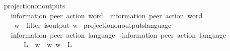 \begin{isabellebody}
\isamarkupfalse%
\ projection{\isacharunderscore}{\kern0pt}on{\isacharunderscore}{\kern0pt}outputs\isanewline
\ \ {\isacharcolon}{\kern0pt}{\isacharcolon}{\kern0pt}\ {\isachardoublequoteopen}{\isacharparenleft}{\kern0pt}{\isacharprime}{\kern0pt}information{\isacharcomma}{\kern0pt}\ {\isacharprime}{\kern0pt}peer{\isacharparenright}{\kern0pt}\ action\ word\ {\isasymRightarrow}\ {\isacharparenleft}{\kern0pt}{\isacharprime}{\kern0pt}information{\isacharcomma}{\kern0pt}\ {\isacharprime}{\kern0pt}peer{\isacharparenright}{\kern0pt}\ action\ word{\isachardoublequoteclose}\ \ {\isacharparenleft}{\kern0pt}{\isachardoublequoteopen}{\isacharunderscore}{\kern0pt}{\isasymdown}\isactrlsub {\isacharbang}{\kern0pt}{\isachardoublequoteclose}\ {\isacharbrackleft}{\kern0pt}{}{}{\isacharbrackright}{\kern0pt}\ {}{}{}{\isacharparenright}{\kern0pt}\isanewline
\ \ \isanewline
\ \ \ \ {\isachardoublequoteopen}w{\isasymdown}\isactrlsub {\isacharbang}{\kern0pt}\ {\isasymequiv}\ filter\ is{\isacharunderscore}{\kern0pt}output\ w{\isachardoublequoteclose}\isanewline
\isanewline
{}\isamarkupfalse%
\ projection{\isacharunderscore}{\kern0pt}on{\isacharunderscore}{\kern0pt}outputs{\isacharunderscore}{\kern0pt}language\isanewline
\ \ {\isacharcolon}{\kern0pt}{\isacharcolon}{\kern0pt}\ {\isachardoublequoteopen}{\isacharparenleft}{\kern0pt}{\isacharprime}{\kern0pt}information{\isacharcomma}{\kern0pt}\ {\isacharprime}{\kern0pt}peer{\isacharparenright}{\kern0pt}\ action\ language\ {\isasymRightarrow}\ {\isacharparenleft}{\kern0pt}{\isacharprime}{\kern0pt}information{\isacharcomma}{\kern0pt}\ {\isacharprime}{\kern0pt}peer{\isacharparenright}{\kern0pt}\ action\ language{\isachardoublequoteclose}\isanewline
\ \ {\isacharparenleft}{\kern0pt}{\isachardoublequoteopen}{\isacharunderscore}{\kern0pt}{\isasymdownharpoonright}\isactrlsub {\isacharbang}{\kern0pt}{\isachardoublequoteclose}\ {\isacharbrackleft}{\kern0pt}{}{}{}{\isacharbrackright}{\kern0pt}\ {}{}{}{\isacharparenright}{\kern0pt}\isanewline
\ \ \isanewline
\ \ \ \ {\isachardoublequoteopen}L{\isasymdownharpoonright}\isactrlsub {\isacharbang}{\kern0pt}\ {\isasymequiv}\ {\isacharbraceleft}{\kern0pt}w{\isasymdown}\isactrlsub {\isacharbang}{\kern0pt}\ {\isacharbar}{\kern0pt}\ w{\isachardot}{\kern0pt}\ w\ {\isasymin}\ L{\isacharbraceright}{\kern0pt}{\isachardoublequoteclose}\isanewline
\isanewline
{}\isamarkupfalse%

\end{isabellebody}
